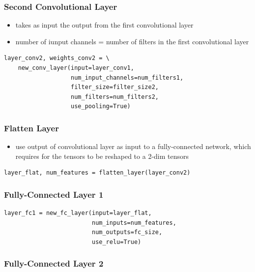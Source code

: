 \documentclass[11pt]{article}
\begin{document}
\subsubsection*{Second Convolutional Layer}
\label{sec:org3a5488e}
\begin{itemize}
\item takes as input the output from the first convolutional layer
\item number of iunput channels = number of filters in the first convolutional layer
\end{itemize}

\begin{verbatim}
layer_conv2, weights_conv2 = \
    new_conv_layer(input=layer_conv1,
                   num_input_channels=num_filters1,
                   filter_size=filter_size2,
                   num_filters=num_filters2,
                   use_pooling=True)
\end{verbatim}
\subsubsection*{Flatten Layer}
\label{sec:org76d712a}

\begin{itemize}
\item use output of convolutional layer as input to a fully-connected network, which
requires for the tensors to be reshaped to a 2-dim tensors
\end{itemize}

\begin{verbatim}
layer_flat, num_features = flatten_layer(layer_conv2)
\end{verbatim}

\subsubsection*{Fully-Connected Layer 1}
\label{sec:org9ecbe0f}

\begin{verbatim}
layer_fc1 = new_fc_layer(input=layer_flat,
                         num_inputs=num_features,
                         num_outputs=fc_size,
                         use_relu=True)
\end{verbatim}
\subsubsection*{Fully-Connected Layer 2}
\label{sec:org36d94a2}
\end{document}
